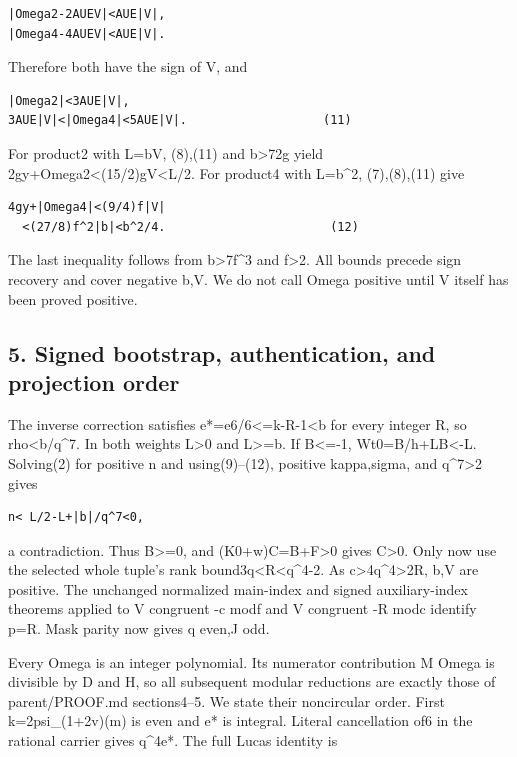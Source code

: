 \begin{verbatim}
|Omega2-2AUEV|<AUE|V|,
|Omega4-4AUEV|<AUE|V|.
\end{verbatim}

Therefore both have the sign of V, and

\begin{verbatim}
|Omega2|<3AUE|V|,
3AUE|V|<|Omega4|<5AUE|V|.                   (11)
\end{verbatim}

For product2 with L=bV, (8),(11) and \textbar b\textbar\textgreater72g
yield
2gy+\textbar Omega2\textbar\textless(15/2)g\textbar V\textbar\textless L/2.
For product4 with L=b\^{}2, (7),(8),(11) give

\begin{verbatim}
4gy+|Omega4|<(9/4)f|V|
  <(27/8)f^2|b|<b^2/4.                       (12)
\end{verbatim}

The last inequality follows from \textbar b\textbar\textgreater7f\^{}3
and f\textgreater2. All bounds precede sign recovery and cover negative
b,V. We do not call Omega positive until V itself has been proved
positive.

\subsection{5. Signed bootstrap, authentication, and projection
order}\label{signed-bootstrap-authentication-and-projection-order}

The inverse correction satisfies e*=e6/6\textless=k-R-1\textless b for
every integer R, so rho\textless\textbar b\textbar/q\^{}7. In both
weights L\textgreater0 and L\textgreater=\textbar b\textbar. If
B\textless=-1, Wt0=B/h+LB\textless-L. Solving(2) for positive n and
using(9)--(12), positive kappa,sigma, and q\^{}7\textgreater2 gives

\begin{verbatim}
n< L/2-L+|b|/q^7<0,
\end{verbatim}

a contradiction. Thus B\textgreater=0, and (K0+w)C=B+F\textgreater0
gives C\textgreater0. Only now use the selected whole tuple's rank
bound3q\textless R\textless q\^{}4-2. As
c\textgreater4q\^{}4\textgreater2R, b,V are positive. The unchanged
normalized main-index and signed auxiliary-index theorems applied to V
congruent -c modf and V congruent -R modc identify p=R. Mask parity now
gives q even,J odd.

Every Omega is an integer polynomial. Its numerator contribution M Omega
is divisible by D and H, so all subsequent modular reductions are
exactly those of parent/PROOF.md sections4--5. We state their
noncircular order. First k=2psi\_(1+2v)(m) is even and e* is integral.
Literal cancellation of6 in the rational carrier gives
q\^{}4\textbar e*. The full Lucas identity is


